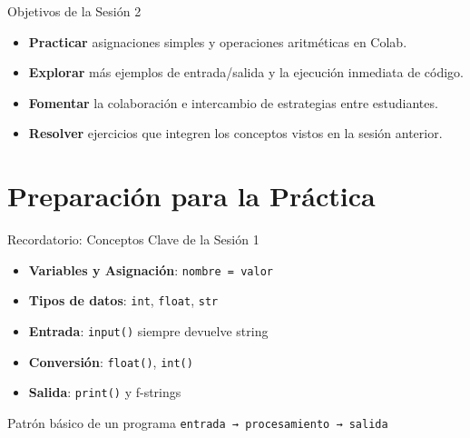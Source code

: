 \documentclass[10pt]{beamer}
\begin{document}
\begin{frame}{Objetivos de la Sesión 2}
  \begin{itemize}
    \item \textbf{Practicar} asignaciones simples y operaciones aritméticas en Colab.
    \item \textbf{Explorar} más ejemplos de entrada/salida y la ejecución inmediata de código.
    \item \textbf{Fomentar} la colaboración e intercambio de estrategias entre estudiantes.
    \item \textbf{Resolver} ejercicios que integren los conceptos vistos en la sesión anterior.
  \end{itemize}
\end{frame}

\section{Preparación para la Práctica}

\begin{frame}{Recordatorio: Conceptos Clave de la Sesión 1}
  \begin{itemize}
    \item \textbf{Variables y Asignación}: \texttt{nombre = valor}
    \item \textbf{Tipos de datos}: \texttt{int}, \texttt{float}, \texttt{str}
    \item \textbf{Entrada}: \texttt{input()} siempre devuelve string
    \item \textbf{Conversión}: \texttt{float()}, \texttt{int()}
    \item \textbf{Salida}: \texttt{print()} y f-strings
  \end{itemize}
  
  \begin{block}{Patrón básico de un programa}
    \texttt{entrada → procesamiento → salida}
  \end{block}
\end{frame}
\end{document}
